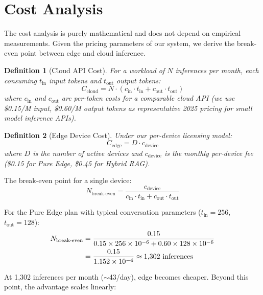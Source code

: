 \documentclass[12pt, letterpaper, twoside]{report}
\newtheorem{definition}{Definition}[chapter]
\begin{document}
\section{Cost Analysis}
\label{sec:cost_analysis}

The cost analysis is purely mathematical and does not depend on empirical measurements. Given the pricing parameters of our system, we derive the break-even point between edge and cloud inference.

\begin{definition}[Cloud API Cost]
For a workload of $N$ inferences per month, each consuming $t_{\text{in}}$ input tokens and $t_{\text{out}}$ output tokens:
\begin{equation}
C_{\text{cloud}} = N \cdot (c_{\text{in}} \cdot t_{\text{in}} + c_{\text{out}} \cdot t_{\text{out}})
\end{equation}
where $c_{\text{in}}$ and $c_{\text{out}}$ are per-token costs for a comparable cloud API (we use \$0.15/M input, \$0.60/M output tokens as representative 2025 pricing for small model inference APIs).
\end{definition}

\begin{definition}[Edge Device Cost]
Under our per-device licensing model:
\begin{equation}
C_{\text{edge}} = D \cdot c_{\text{device}}
\end{equation}
where $D$ is the number of active devices and $c_{\text{device}}$ is the monthly per-device fee (\$0.15 for Pure Edge, \$0.45 for Hybrid RAG).
\end{definition}

The break-even point for a single device:
\begin{equation}
N_{\text{break-even}} = \frac{c_{\text{device}}}{c_{\text{in}} \cdot t_{\text{in}} + c_{\text{out}} \cdot t_{\text{out}}}
\end{equation}

For the Pure Edge plan with typical conversation parameters ($t_{\text{in}} = 256$, $t_{\text{out}} = 128$):
\begin{align}
N_{\text{break-even}} &= \frac{0.15}{0.15 \times 256 \times 10^{-6} + 0.60 \times 128 \times 10^{-6}} \notag \\
&= \frac{0.15}{1.152 \times 10^{-4}} \approx 1{,}302 \text{ inferences}
\end{align}

At 1,302 inferences per month ($\sim$43/day), edge becomes cheaper. Beyond this point, the advantage scales linearly:
\end{document}
